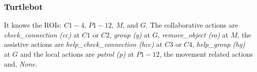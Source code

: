\subsubsection{Turtlebot}
It knows the ROIs: $C1-4$, $P1-12$, $M$, and $G$. The collaborative actions are  \textit{check\_connection (cc)} at $C1$ or $C2$, \textit{group (g)} at $G$, \textit{remove\_object (ro)} at $M$, the assistive actions are \textit{help\_check\_connection (hcc)} at $C3$ or $C4$, \textit{help\_group (hg)} at $G$  and the local actions are \textit{patrol (p)} at $P1-12$, the movement related actions and, \textit{None}.
\begin{comment}
   The non-movement actions are listed in Tab. \ref{tab:act_turtlebot}.
\begin{table}[ht]
    \centering
    \begin{tabular}{c||c|c}
        \textbf{Action} &  \textbf{Type} & \textbf{Cond}\\
        \hline\hline
        \textit{check\_connection (cc)} &  collaborative & $C1$, $C2$\\
        \hline
        \textit{group (g)} &  collaborative & $G$\\
        \hline
        \textit{remove\_object (ro)} &  collaborative & $M$\\
        \hline
        \textit{help\_check\_connection (hcc)} &  assistive & $C3$, $C4$ \\
        \hline
        \textit{help\_group (hg)} &  assistive & $G$\\
        \hline
        \textit{patrol (p)} &  local & $P1-14$\\
        \hline
        \textit{None} &  local &  \\
        \hline\hline
    \end{tabular}
    \caption{Action model for Turtlebots}
    \label{tab:act_turtlebot}
\end{table} 
\end{comment}

